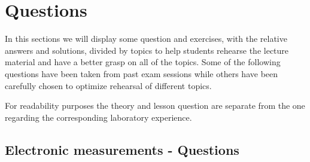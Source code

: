 \documentclass[../main.tex]{subfiles}
\begin{document}
\clearpage
\thispagestyle{empty}
\vspace*{7cm}
\section{Questions}
\vspace*{1.5cm}

In this sections we will display some question and exercises, with the relative answers and solutions, divided by topics to help students rehearse the lecture material and have a better grasp on all of the topics. Some of the following questions have been taken from past exam sessions while others have been carefully chosen to optimize rehearsal of different topics.

For readability purposes the theory and lesson question are separate from the one regarding the corresponding laboratory experience.

\vspace*{1.5cm}
\subsection{Electronic measurements - Questions}
\end{document}
